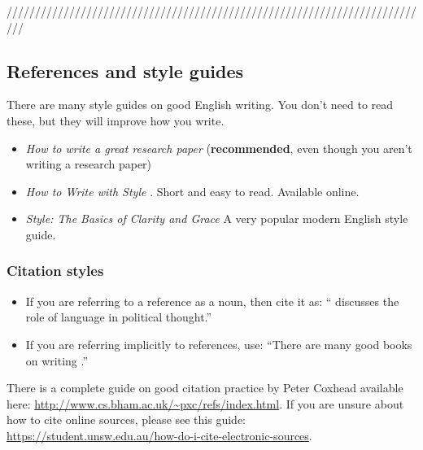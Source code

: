 \documentclass{l4proj}
\begin{document}
///////////////////////////////////////////////////////////////////////////

\subsection{References and style guides}
There are many style guides on good English writing. You don't need to
read these, but they will improve how you write.

\begin{itemize}
    \item
    \emph{How to write a great research paper} \cite{Pey17} (\textbf{recommended}, even though you aren't writing a research paper)
    \item
    \emph{How to Write with Style} \cite{Von80}. Short and easy to read. Available online.
    \item
    \emph{Style: The Basics of Clarity and Grace} \cite{Wil09} A very popular modern English style guide.
\end{itemize}

\subsubsection{Citation styles}

\begin{itemize}
\item If you are referring to a reference as a noun, then cite it as: ``\citet{Orw68} discusses the role of language in political thought.''
\item If you are referring implicitly to references, use: ``There are many good books on writing \citep{Orw68, Wil09, Pin15}.''
\end{itemize}

There is a complete guide on good citation practice by Peter Coxhead available here: \url{http://www.cs.bham.ac.uk/~pxc/refs/index.html}. 
If you are unsure about how to cite online sources, please see this guide: \url{https://student.unsw.edu.au/how-do-i-cite-electronic-sources}.

%
% 
\end{document}
